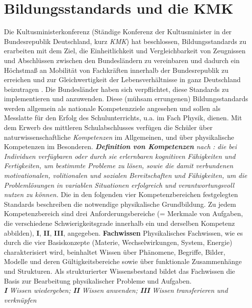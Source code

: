 \section{Bildungsstandards und die KMK}\label{KmK}
Die Kultusministerkonferenz (Ständige Konferenz der Kultusminister in der Bundesrepublik Deutschland, kurz \emph{KMK}) hat beschlossen, Bildungsstandards zu erarbeiten mit dem Ziel, die Einheitlichkeit und Vergleichbarkeit von Zeugnissen und Abschl{\"u}ssen zwischen den Bundesl{\"a}ndern zu vereinbaren und dadurch ein H{\"o}chstma{\ss} an Mobilit{\"a}t von Fachkr{\"a}ften innerhalb der Bundesrepublik zu erreichen und  zur Gleichwertigkeit der Lebensverh{\"a}ltnisse in ganz Deutschland beizutragen \autocite{KMK}. Die Bundesl{\"a}nder haben sich verpflichtet, diese Standards zu implementieren und anzuwenden. Diese (m{\"u}hsam errungenen) Bildungsstandards werden allgemein als nationale Kompetenzziele angesehen und sollen als Messlatte f{\"u}r den Erfolg des Schulunterrichts, u.a. im Fach Physik, dienen. 
\mip
Mit dem Erwerb des mittleren Schulabschlusses verf{\"u}gen die Schüler {\"u}ber naturwissenschaftliche \emph{Kompetenzen} im Allgemeinen, und {\"u}ber physikalische Kompetenzen im Besonderen. 
\mip
\leftskip=0.5cm \rightskip=0.5cm {\emph{{\textbf{Definition von Kompetenzen}} nach \textcite{Weinert}: die bei Individuen verf{\"u}gbaren oder durch sie erlernbaren kognitiven F{\"a}higkeiten und Fertigkeiten, um bestimmte Probleme zu 
l{\"o}sen, sowie die damit verbundenen motivationalen, volitionalen und sozialen Bereitschaften und F{\"a}higkeiten, um die Probleml{\"o}sungen in variablen Situationen erfolgreich und verantwortungsvoll nutzen zu k{\"o}nnen.}} 
\mip
\leftskip=0cm \rightskip=0cm Die in den folgenden vier Kompetenzbereichen festgelegten Standards beschreiben die notwendige physikalische Grundbildung. Zu jedem Kompetenzbereich sind drei Anforderungsbereiche  (= Merkmale von Aufgaben, die verschiedene Schwierigkeitsgrade innerhalb ein und derselben Kompetenz abbilden), \textbf{I}, \textbf{II}, \textbf{III}, angegeben. 
\mip
{\textbf{Fachwissen}} \tabto{7em} \hangindent=2.7cm Physikalisches Fachwissen, wie es durch die vier Basiskonzepte (Materie, Wechselwirkungen, System, Energie) charakterisiert wird, beinhaltet Wissen {\"u}ber Ph{\"a}nomene, Begriffe, Bilder, Modelle und deren G{\"u}ltigkeitsbereiche sowie {\"u}ber funktionale Zusammenh{\"a}nge und Strukturen. Als strukturierter Wissensbestand bildet das Fachwissen die Basis zur Bearbeitung physikalischer Probleme und Aufgaben. \\ \emph{\textbf{I} Wissen wiedergeben; \textbf{II} Wissen anwenden; \textbf{III} Wissen transferieren und verkn{\"u}pfen}
